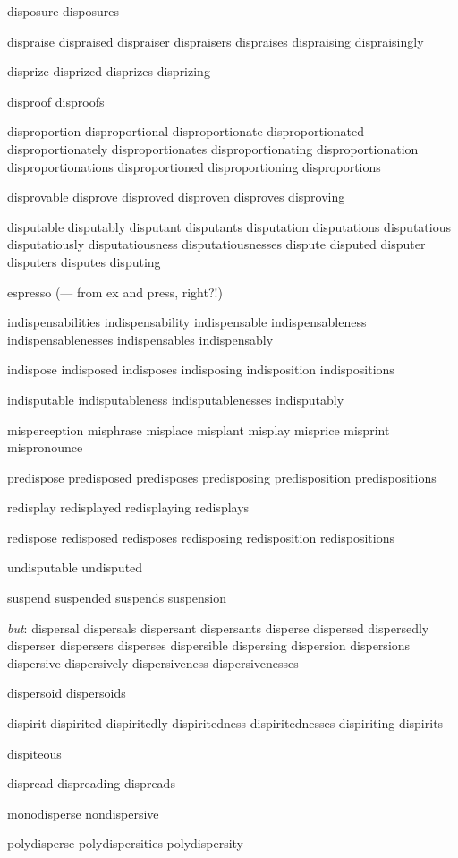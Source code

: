 \begin{itemize}
disposure disposures

dispraise dispraised dispraiser dispraisers dispraises dispraising dispraisingly

disprize disprized disprizes disprizing

disproof disproofs

disproportion disproportional disproportionate disproportionated disproportionately disproportionates disproportionating disproportionation disproportionations disproportioned disproportioning disproportions

disprovable disprove disproved disproven disproves disproving

disputable disputably disputant disputants disputation disputations disputatious disputatiously disputatiousness disputatiousnesses dispute disputed disputer disputers disputes disputing

espresso (--- from ex and press, right?!)

indispensabilities indispensability indispensable indispensableness indispensablenesses indispensables indispensably

indispose indisposed indisposes indisposing indisposition indispositions

indisputable indisputableness indisputablenesses indisputably

misperception misphrase misplace misplant misplay misprice misprint mispronounce 

predispose predisposed predisposes predisposing predisposition predispositions

redisplay redisplayed redisplaying redisplays

redispose redisposed redisposes redisposing redisposition redispositions

undisputable undisputed

suspend suspended suspends suspension


\emph{but}: dispersal dispersals dispersant dispersants disperse dispersed dispersedly disperser dispersers disperses dispersible dispersing dispersion dispersions dispersive dispersively dispersiveness dispersivenesses

dispersoid dispersoids

dispirit dispirited dispiritedly dispiritedness dispiritednesses dispiriting dispirits

dispiteous

dispread dispreading dispreads

monodisperse nondispersive

polydisperse polydispersities polydispersity

\end{itemize}




